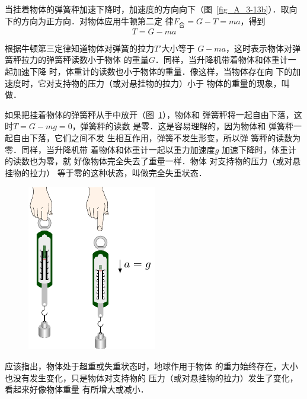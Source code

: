     当挂着物体的弹簧秤加速下降时，加速度的方向向下（图~\ref{fig_A_3-13b}）．取向下的方向为正方向．对物体应用牛顿第二定
律$F_{\text{合}}=G-T=ma$，得到
                               \[T=G-ma\]
    
根据牛顿第三定律知道物体对弹簧的拉力$T'$大小等于
$G-ma$，这时表示物体对弹簧秤拉力的弹簧秤读数小于物体
的重量$G$．同样，当升降机带着物体和体重计一起加速下降
时，体重计的读数也小于物体的重量．像这样，当物体存在向
下的加速度时，它对支持物的压力（或对悬挂物的拉力）小于
物体的重量的现象，叫做．


    如果把挂着物体的弹簧秤从手中放开（图~\ref{fig_A_3-14}），物体和
弹簧秤将一起自由下落，这时$T=G-mg=0$，弹簧秤的读数
是零．这是容易理解的，因为物体和
弹簧秤一起自由下落，它们之间不发
生相互作用，弹簧不发生形变，所以弹
簧秤的读数为零．同样，当升降机带
着物体和体重计一起以重力加速度$g$
加速下降时，体重计的读数也为零，就
好像物体完全失去了重量一样．物体
对支持物的压力（或对悬挂物的拉力）
等于零的这种状态，叫做完全失重状态．
\begin{figure}[htbp]
	\centering
	\includegraphics{fig/A/3-14.pdf}
	\caption{}\label{fig_A_3-14}
\end{figure}


    应该指出，物体处于超重或失重状态时，地球作用于物体
的重力始终存在，大小也没有发生变化，只是物体对支持物的
压力（或对悬挂物的拉力）发生了变化，看起来好像物体重量
有所增大或减小．


